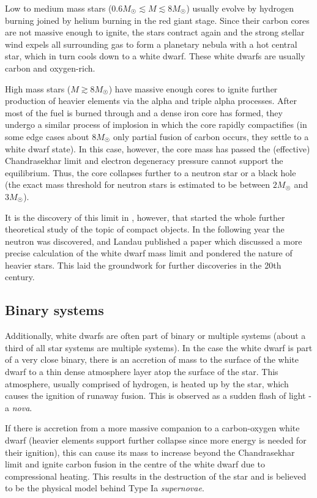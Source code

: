 \documentclass[]{article}
\begin{document}
	Low to medium mass stars ($0.6 M_{\astrosun} \lesssim M \lesssim 8 M_{\astrosun}$) usually evolve by hydrogen burning joined by helium burning in the red giant stage. Since their carbon cores are not massive enough to ignite, the stars contract again and the strong stellar wind expels all surrounding gas to form a planetary nebula with a hot central star, which in turn cools down to a white dwarf. These white dwarfs are usually carbon and oxygen-rich.

	High mass stars ($M \gtrsim 8 M_{\astrosun}$) have massive enough cores to ignite further production of heavier elements via the alpha and triple alpha processes. After most of the fuel is burned through and a dense iron core has formed, they undergo a similar process of implosion in which the core rapidly compactifies (in some edge cases about $8 M_{\astrosun}$ only partial fusion of carbon occurs, they settle to a white dwarf state). In this case, however, the core mass has passed the (effective) Chandrasekhar limit and electron degeneracy pressure cannot support the equilibrium. Thus, the core collapses further to a neutron star or a black hole (the exact mass threshold for neutron stars is estimated to be between $2 M_{\astrosun}$ and $3 M_{\astrosun}$).

	It is the discovery of this limit in \cite{Chandrasekhar1931}, however, that started the whole further theoretical study of the topic of compact objects. In the following year the neutron was discovered, and Landau published a paper which discussed a more precise calculation of the white dwarf mass limit and pondered the nature of heavier stars. This laid the groundwork for further discoveries in the 20th century.

	\subsection{Binary systems}
	Additionally, white dwarfs are often part of binary or multiple systems (about a third of all star systems are multiple systems). In the case the white dwarf is part of a very close binary, there is an accretion of mass to the surface of the white dwarf to a thin dense atmosphere layer atop the surface of the star. This atmosphere, usually comprised of hydrogen, is heated up by the star, which causes the ignition of runaway fusion. This is observed as a sudden flash of light - a \emph{nova}.

	If there is accretion from a more massive companion to a carbon-oxygen white dwarf (heavier elements support further collapse since more energy is needed for their ignition), this can cause its mass to increase beyond the Chandrasekhar limit and ignite carbon fusion in the centre of the white dwarf due to compressional heating. This results in the destruction of the star and is believed to be the physical model behind Type Ia \emph{supernovae}.
	
\end{document}
